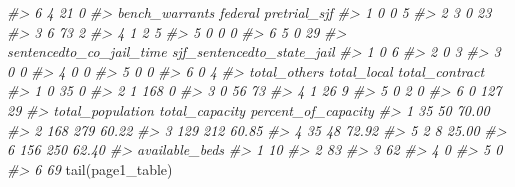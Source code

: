\documentclass[
]{krantz}
\makeatletter
\newenvironment{Shaded}{\begin{snugshade}}{\end{snugshade}}
\newcommand{\CommentTok}[1]{\textcolor[rgb]{0.37,0.37,0.37}{\textit{#1}}}
\newcommand{\FunctionTok}[1]{\textcolor[rgb]{0,0,0}{#1}}
\newcommand{\NormalTok}[1]{#1}
\newenvironment{kframe}{%
\medskip{}
\setlength{\fboxsep}{.8em}
 \def\at@end@of@kframe{}%
 \ifinner\ifhmode%
  \def\at@end@of@kframe{\end{minipage}}%
  \begin{minipage}{\columnwidth}%
 \fi\fi%
 \def\FrameCommand##1{\hskip\@totalleftmargin \hskip-\fboxsep
 \colorbox{shadecolor}{##1}\hskip-\fboxsep
     \hskip-\linewidth \hskip-\@totalleftmargin \hskip\columnwidth}%
 \MakeFramed {\advance\hsize-\width
   \@totalleftmargin\z@ \linewidth\hsize
   \@setminipage}}%
 {\par\unskip\endMakeFramed%
 \at@end@of@kframe}
\renewenvironment{Shaded}{\begin{kframe}}{\end{kframe}}
\makeatother
\begin{document}
\begin{Shaded}
\begin{Highlighting}[]
\CommentTok{\#\textgreater{} 6                          4            21         0}
\CommentTok{\#\textgreater{}   bench\_warrants federal pretrial\_sjf}
\CommentTok{\#\textgreater{} 1              0       0            5}
\CommentTok{\#\textgreater{} 2              3       0           23}
\CommentTok{\#\textgreater{} 3              6      73            2}
\CommentTok{\#\textgreater{} 4              1       2            5}
\CommentTok{\#\textgreater{} 5              0       0            0}
\CommentTok{\#\textgreater{} 6              5       0           29}
\CommentTok{\#\textgreater{}   sentencedto\_co\_jail\_time sjf\_sentencedto\_state\_jail}
\CommentTok{\#\textgreater{} 1                        0                          6}
\CommentTok{\#\textgreater{} 2                        0                          3}
\CommentTok{\#\textgreater{} 3                        0                          0}
\CommentTok{\#\textgreater{} 4                        0                          0}
\CommentTok{\#\textgreater{} 5                        0                          0}
\CommentTok{\#\textgreater{} 6                        0                          4}
\CommentTok{\#\textgreater{}   total\_others total\_local total\_contract}
\CommentTok{\#\textgreater{} 1            0          35              0}
\CommentTok{\#\textgreater{} 2            1         168              0}
\CommentTok{\#\textgreater{} 3            0          56             73}
\CommentTok{\#\textgreater{} 4            1          26              9}
\CommentTok{\#\textgreater{} 5            0           2              0}
\CommentTok{\#\textgreater{} 6            0         127             29}
\CommentTok{\#\textgreater{}   total\_population total\_capacity percent\_of\_capacity}
\CommentTok{\#\textgreater{} 1               35             50               70.00}
\CommentTok{\#\textgreater{} 2              168            279               60.22}
\CommentTok{\#\textgreater{} 3              129            212               60.85}
\CommentTok{\#\textgreater{} 4               35             48               72.92}
\CommentTok{\#\textgreater{} 5                2              8               25.00}
\CommentTok{\#\textgreater{} 6              156            250               62.40}
\CommentTok{\#\textgreater{}   available\_beds}
\CommentTok{\#\textgreater{} 1             10}
\CommentTok{\#\textgreater{} 2             83}
\CommentTok{\#\textgreater{} 3             62}
\CommentTok{\#\textgreater{} 4              0}
\CommentTok{\#\textgreater{} 5              0}
\CommentTok{\#\textgreater{} 6             69}
\FunctionTok{tail}\NormalTok{(page1\_table)}

\end{Highlighting}
\end{Shaded}
\end{document}
